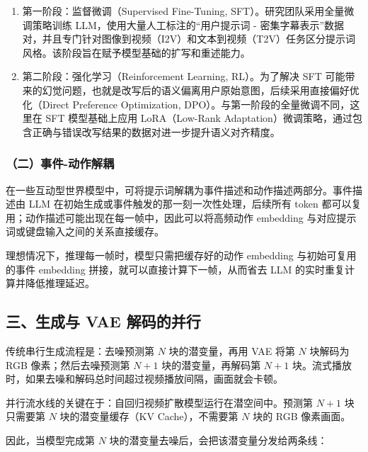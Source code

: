 \begin{enumerate}
\def\labelenumi{\arabic{enumi}.}
\tightlist
\item
  第一阶段：监督微调（Supervised Fine-Tuning, SFT）。研究团队采用全量微调策略训练 LLM，使用大量人工标注的``用户提示词 - 密集字幕表示''数据对，并且专门针对图像到视频（I2V）和文本到视频（T2V）任务区分提示词风格。该阶段旨在赋予模型基础的扩写和重述能力。
\item
  第二阶段：强化学习（Reinforcement Learning, RL）。为了解决 SFT 可能带来的幻觉问题，也就是改写后的语义偏离用户原始意图，后续采用直接偏好优化（Direct Preference Optimization, DPO）。与第一阶段的全量微调不同，这里在 SFT 模型基础上应用 LoRA（Low-Rank Adaptation）微调策略，通过包含正确与错误改写结果的数据对进一步提升语义对齐精度。
\end{enumerate}

\hypertarget{ux4e8cux4e8bux4ef6-ux52a8ux4f5cux89e3ux8026}{%
\subsubsection{（二）事件-动作解耦}\label{ux4e8cux4e8bux4ef6-ux52a8ux4f5cux89e3ux8026}}

在一些互动型世界模型中，可将提示词解耦为事件描述和动作描述两部分。事件描述由 LLM 在初始生成或事件触发的那一刻一次性处理，后续所有 token 都可以复用；动作描述可能出现在每一帧中，因此可以将高频动作 embedding 与对应提示词或键盘输入之间的关系直接缓存。

理想情况下，推理每一帧时，模型只需把缓存好的动作 embedding 与初始可复用的事件 embedding 拼接，就可以直接计算下一帧，从而省去 LLM 的实时重复计算并降低推理延迟。

\hypertarget{ux4e09ux751fux6210ux4e0e-vae-ux89e3ux7801ux7684ux5e76ux884c}{%
\subsection{三、生成与 VAE 解码的并行}\label{ux4e09ux751fux6210ux4e0e-vae-ux89e3ux7801ux7684ux5e76ux884c}}

传统串行生成流程是：去噪预测第 \(N\) 块的潜变量，再用 VAE 将第 \(N\) 块解码为 RGB 像素；然后去噪预测第 \(N+1\) 块的潜变量，再解码第 \(N+1\) 块。流式播放时，如果去噪和解码总时间超过视频播放间隔，画面就会卡顿。

并行流水线的关键在于：自回归视频扩散模型运行在潜空间中。预测第 \(N+1\) 块只需要第 \(N\) 块的潜变量缓存（KV Cache），不需要第 \(N\) 块的 RGB 像素画面。

因此，当模型完成第 \(N\) 块的潜变量去噪后，会把该潜变量分发给两条线：

